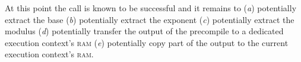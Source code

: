 

\begin{center}
\end{center}
At this point the \instModexp{} call is known to be successful and it remains to
(\emph{a}) potentially extract the base
(\emph{b}) potentially extract the exponent
(\emph{c}) potentially extract the modulus
(\emph{d}) potentially transfer the output of the precompile to a dedicated execution context's \textsc{ram}
(\emph{e}) potentially copy part of the output to the current execution context's \textsc{ram}.

